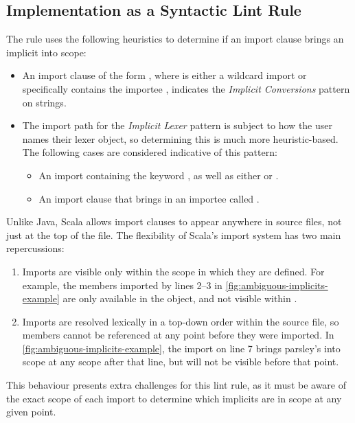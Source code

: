 \documentclass[../../main.tex]{subfiles}
\begin{document}
\subsection{Implementation as a Syntactic Lint Rule}
The rule uses the following heuristics to determine if an import clause brings an implicit into scope:
\begin{itemize}
  \item An import clause of the form , where  is either a wildcard import or specifically contains the importee , indicates the \emph{Implicit Conversions} pattern on strings.
  \item The import path for the \emph{Implicit Lexer} pattern is subject to how the user names their lexer object, so determining this is much more heuristic-based. The following cases are considered indicative of this pattern:
  \begin{itemize}
    \item An import containing the keyword , as well as either  or .
    \item An import clause that brings in an importee called .
  \end{itemize}
\end{itemize}
%
Unlike Java, Scala allows import clauses to appear anywhere in source files, not just at the top of the file.
The flexibility of Scala's import system has two main repercussions:
\begin{enumerate}
  \item Imports are visible only within the scope in which they are defined. For example, the members imported by lines 2--3 in \cref{fig:ambiguous-implicits-example} are only available in the  object, and not visible within .
  \item Imports are resolved lexically in a top-down order within the source file, so members cannot be referenced at any point before they were imported. In \cref{fig:ambiguous-implicits-example}, the import on line 7 brings parsley's  into scope at any scope after that line, but will not be visible before that point.
\end{enumerate} 
This behaviour presents extra challenges for this lint rule, as it must be aware of the exact scope of each import to determine which implicits are in scope at any given point.
\end{document}
